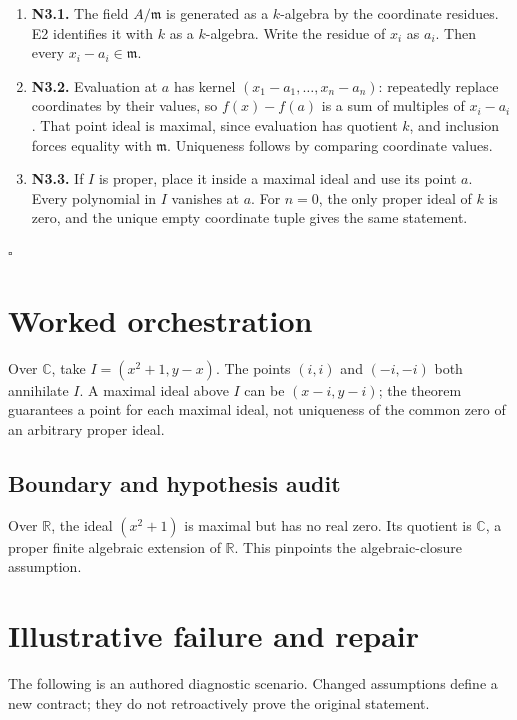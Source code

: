 \documentclass[preprint,12pt,aps,pra,showkeys,amsmath,amssymb,superscriptaddress,floatfix]{revtex4-2}
\theoremstyle{definition}
\theoremstyle{remark}
\begin{document}
\begin{enumerate}
\def\labelenumi{\arabic{enumi}.}
\item
  \textbf{N3.1.} The field \(A/\mathfrak m\) is generated as a
  \(k\)-algebra by the coordinate residues. E2 identifies it with \(k\)
  as a \(k\)-algebra. Write the residue of \(x_i\) as \(a_i\). Then
  every \(x_i-a_i\in\mathfrak m\).
\item
  \textbf{N3.2.} Evaluation at \(a\) has kernel
  \((x_1-a_1,\ldots,x_n-a_n)\): repeatedly replace coordinates by their
  values, so \(f(x)-f(a)\) is a sum of multiples of \(x_i-a_i\). That
  point ideal is maximal, since evaluation has quotient \(k\), and
  inclusion forces equality with \(\mathfrak m\). Uniqueness follows by
  comparing coordinate values.
\item
  \textbf{N3.3.} If \(I\) is proper, place it inside a maximal ideal and
  use its point \(a\). Every polynomial in \(I\) vanishes at \(a\). For
  \(n=0\), the only proper ideal of \(k\) is zero, and the unique empty
  coordinate tuple gives the same statement.
\end{enumerate}

\hfill$\square$

\section{Worked orchestration}

Over \(\mathbb C\), take \(I=(x^2+1,y-x)\). The points \((i,i)\) and
\((-i,-i)\) both annihilate \(I\). A maximal ideal above \(I\) can be
\((x-i,y-i)\); the theorem guarantees a point for each maximal ideal,
not uniqueness of the common zero of an arbitrary proper ideal.

\subsection{Boundary and hypothesis audit}

Over \(\mathbb R\), the ideal \((x^2+1)\) is maximal but has no real
zero. Its quotient is \(\mathbb C\), a proper finite algebraic extension
of \(\mathbb R\). This pinpoints the algebraic-closure assumption.

\section{Illustrative failure and repair}

The following is an authored diagnostic scenario. Changed assumptions
define a new contract; they do not retroactively prove the original
statement.
\end{document}
